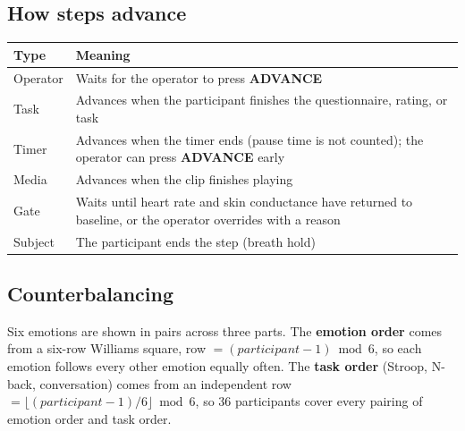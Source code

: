 \documentclass[11pt,a4paper]{article}
\newcommand{\ui}[1]{\textsf{\textbf{#1}}}
\begin{document}
\begin{center}
\end{center}

\subsection{How steps advance}
\begin{tabularx}{\linewidth}{@{}lX@{}}
\toprule
\textbf{Type} & \textbf{Meaning} \\
\midrule
Operator & Waits for the operator to press \ui{ADVANCE} \\
Task & Advances when the participant finishes the questionnaire, rating, or task \\
Timer & Advances when the timer ends (pause time is not counted); the operator can press \ui{ADVANCE} early \\
Media & Advances when the clip finishes playing \\
Gate & Waits until heart rate and skin conductance have returned to baseline, or the operator overrides with a reason \\
Subject & The participant ends the step (breath hold) \\
\bottomrule
\end{tabularx}

\subsection{Counterbalancing}\label{sec:counterbalancing}
Six emotions are shown in pairs across three parts. The \textbf{emotion order} comes from a six-row Williams square,
row $= (\mathit{participant}-1) \bmod 6$, so each emotion follows every other emotion equally often. The \textbf{task
order} (Stroop, N-back, conversation) comes from an independent row $= \lfloor(\mathit{participant}-1)/6\rfloor \bmod 6$,
so 36 participants cover every pairing of emotion order and task order.
\end{document}

